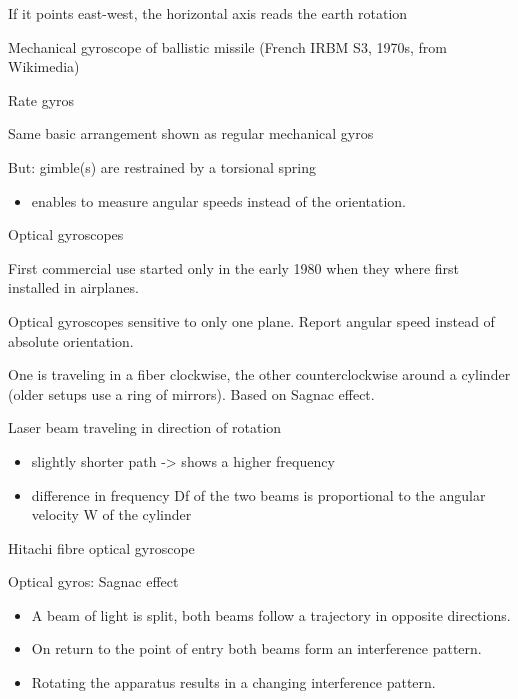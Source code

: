 \documentclass[compress]{beamer}
\providecommand{\tightlist}{%
  \setlength{\itemsep}{0pt}\setlength{\parskip}{0pt}}
\begin{document}
\begin{frame}{If it points east-west, the horizontal axis reads the
earth rotation}

Mechanical gyroscope of ballistic missile (French IRBM S3, 1970s, from
Wikimedia)

\end{frame}

\begin{frame}{Rate gyros}

Same basic arrangement shown as regular mechanical gyros

But: gimble(s) are restrained by a torsional spring

\begin{itemize}
\tightlist
\item
  enables to measure angular speeds instead of the orientation.
\end{itemize}

\end{frame}

\begin{frame}{Optical gyroscopes}

First commercial use started only in the early 1980 when they where
first installed in airplanes.

Optical gyroscopes sensitive to only one plane. Report angular speed
instead of absolute orientation.

One is traveling in a fiber clockwise, the other counterclockwise around
a cylinder (older setups use a ring of mirrors). Based on Sagnac effect.

Laser beam traveling in direction of rotation

\begin{itemize}
\tightlist
\item
  slightly shorter path -\textgreater{} shows a higher frequency
\item
  difference in frequency Df of the two beams is proportional to the
  angular velocity W of the cylinder
\end{itemize}

Hitachi fibre optical gyroscope

\end{frame}

\begin{frame}{Optical gyros: Sagnac effect}

\begin{itemize}
\tightlist
\item
  A beam of light is split, both beams follow a trajectory in opposite
  directions.
\item
  On return to the point of entry both beams form an interference
  pattern.
\item
  Rotating the apparatus results in a changing interference pattern.
\end{itemize}

\end{frame}
\end{document}
